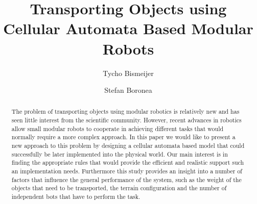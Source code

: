 \documentclass[runningheads]{llncs}
\title{Transporting Objects using Cellular Automata Based Modular Robots}
\author{Tycho Bismeijer\inst{1} \and Stefan Boronea\inst{1}}
\institute{Vrije Universiteit Amsterdam}
\date{}
\begin{document}
\maketitle

\begin{abstract}
The problem of transporting objects using modular robotics is relatively new and has seen little interest from the scientific community. However, recent advances in robotics allow small modular robots to cooperate in achieving different tasks that would normally require a more complex approach. In this paper we would like to present a new approach to this problem by designing a cellular automata based model that could successfully be later implemented into the physical world. Our main interest is in finding the appropriate rules that would provide the efficient and realistic support such an implementation needs. Furthermore this study provides an insight into a number of factors that influence the general performance of the system, such as the weight of the objects that need to be transported, the terrain configuration and the number of independent bots that have to perform the task. 
\end{abstract}















\end{document}
